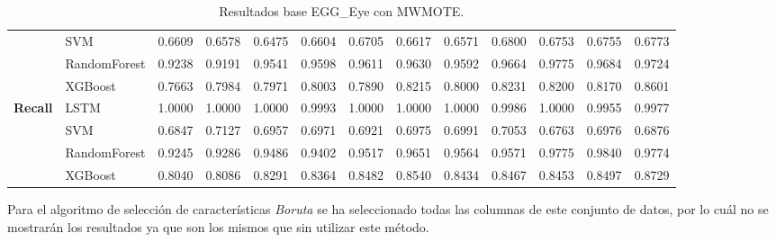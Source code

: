 \begin{table}[h]
\begin{adjustbox}{max width=15cm}
\begin{tabular}{|c|l|r|r|r|r|r|r|r|r|r|r|r|}
			& SVM &  0.6609 &  0.6578 &  0.6475 &  0.6604 &  0.6705 &  0.6617 &  0.6571 &  0.6800 &  0.6753 &  0.6755 &  0.6773 \\
			& RandomForest &  0.9238 &  0.9191 &  0.9541 &  0.9598 &  0.9611 &  0.9630 &  0.9592 &  0.9664 &  0.9775 &  0.9684 &  0.9724 \\
			& XGBoost &  0.7663 &  0.7984 &  0.7971 &  0.8003 &  0.7890 &  0.8215 &  0.8000 &  0.8231 &  0.8200 &  0.8170 &  0.8601 \\
			\hline
			\textbf{Recall} & LSTM &  1.0000 &  1.0000 &  1.0000 &  0.9993 &  1.0000 &  1.0000 &  1.0000 &  0.9986 &  1.0000 &  0.9955 &  0.9977 \\
			& SVM &  0.6847 &  0.7127 &  0.6957 &  0.6971 &  0.6921 &  0.6975 &  0.6991 &  0.7053 &  0.6763 &  0.6976 &  0.6876 \\
			& RandomForest &  0.9245 &  0.9286 &  0.9486 &  0.9402 &  0.9517 &  0.9651 &  0.9564 &  0.9571 &  0.9775 &  0.9840 &  0.9774 \\
			& XGBoost &  0.8040 &  0.8086 &  0.8291 &  0.8364 &  0.8482 &  0.8540 &  0.8434 &  0.8467 &  0.8453 &  0.8497 &  0.8729 \\
			\hline
		\end{tabular}
	\end{adjustbox}
	\label{tab:EGGEyeMWMOTE}
	\caption{Resultados base EGG\_Eye con MWMOTE.}
\end{table}

Para el algoritmo de selección de características \textit{Boruta} se ha  seleccionado todas las columnas de este conjunto de datos, por lo cuál no se mostrarán los resultados ya que son los mismos que sin utilizar este método.\newline

\newpage
